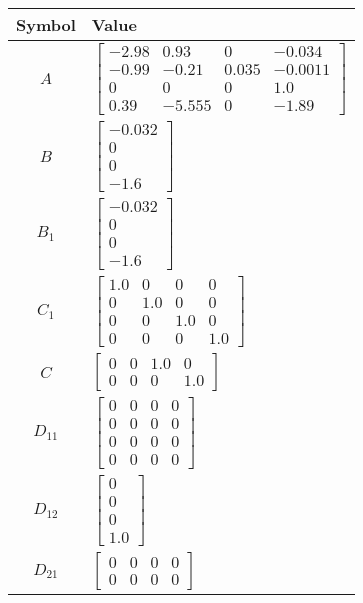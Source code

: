 \begin{tabular}{cl}
\hline
  Symbol  & Value                                                                                                                                           \\
\hline
   $A$    & $\left[\begin{matrix}-2.98 & 0.93 & 0 & -0.034\\-0.99 & -0.21 & 0.035 & -0.0011\\0 & 0 & 0 & 1.0\\0.39 & -5.555 & 0 & -1.89\end{matrix}\right]$ \\
   $B$    & $\left[\begin{matrix}-0.032\\0\\0\\-1.6\end{matrix}\right]$                                                                                     \\
 $B_{1}$  & $\left[\begin{matrix}-0.032\\0\\0\\-1.6\end{matrix}\right]$                                                                                     \\
 $C_{1}$  & $\left[\begin{matrix}1.0 & 0 & 0 & 0\\0 & 1.0 & 0 & 0\\0 & 0 & 1.0 & 0\\0 & 0 & 0 & 1.0\end{matrix}\right]$                                     \\
   $C$    & $\left[\begin{matrix}0 & 0 & 1.0 & 0\\0 & 0 & 0 & 1.0\end{matrix}\right]$                                                                       \\
 $D_{11}$ & $\left[\begin{matrix}0 & 0 & 0 & 0\\0 & 0 & 0 & 0\\0 & 0 & 0 & 0\\0 & 0 & 0 & 0\end{matrix}\right]$                                             \\
 $D_{12}$ & $\left[\begin{matrix}0\\0\\0\\1.0\end{matrix}\right]$                                                                                           \\
 $D_{21}$ & $\left[\begin{matrix}0 & 0 & 0 & 0\\0 & 0 & 0 & 0\end{matrix}\right]$                                                                           \\
\hline
\end{tabular}